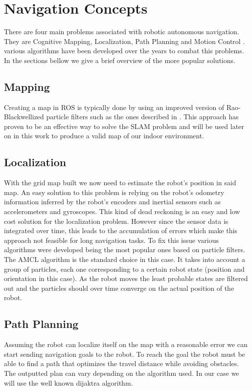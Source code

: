 
\section {Navigation Concepts}
There are four main problems associated with robotic autonomous navigation. They are Cognitive Mapping, Localization, Path Planning and Motion Control \cite{baranov2014}.  various algorithms have been developed over the years to combat this problems. In the sections bellow we give a brief overview of the more popular solutions.

\subsection{Mapping}

Creating a map in ROS is typically done by using an improved version of  Rao-Blackwellized particle filters such as the ones described in \cite{grisetti2007improved}. This approach has proven to be an effective way to solve the \ac{SLAM} problem and will be used later on in this work to produce a valid map of our indoor environment.
\subsection{Localization}
With the grid map built we now need to estimate the robot's position in said map. 
An easy solution to this problem is relying on the robot's odometry information inferred by the robot's encoders and inertial sensors such as accelerometers and gyroscopes. This kind of dead reckoning is an easy and low cost solution for the localization problem. However since the sensor data is integrated over time, this leads to the accumulation of errors which make this approach not feasible for long navigation tasks. 
To fix this issue various algorithms were developed being the most popular ones based on particle filters.
The \ac{AMCL} algorithm  is the standard choice in this case. It takes into account a group of particles, each one corresponding to a certain robot state (position and orientation in this case). As the robot moves the least probable states are filtered out and  the particles should over time converge on the actual position of the robot.  
\subsection{Path Planning}
Assuming the robot can localize itself on the map with a reasonable error we can start sending navigation goals to the robot. To reach the goal the robot must be able to find a path that optimizes the travel distance while avoiding obstacles. The outputted plan can vary depending on the algorithm used. In our case we will use the well known dijaktra algorithm.
